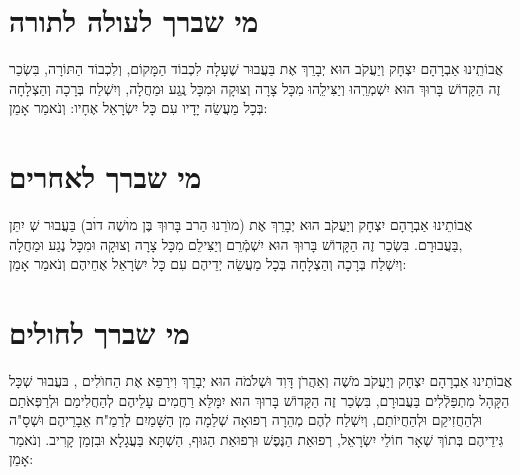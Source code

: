 \documentclass[a4paper, twoside, openany, parskip=half, 12pt]{article}
\begin{document}
\section*{מי שברך לעולה לתורה}
 אֲבוֹתֵֽינוּ אַבְרָהָם יִצְחָק וְיַעֲקֹב הוּא יְבָרֵךְ אֶת 
  בַּעֲבוּר שֶׁעָלָה לִכְבוֹד הַמָּקוֹם,  וְלִכְבוֹד הַתּוֹרָה, 
 בִּשְׂכַר זֶה הַקָּדוֹשׁ בָּרוּךְ הוּא יִשְׁמְרֵֽהוּ וְיַצִּילֵֽהוּ מִכָּל צָרָה וְצוּקָה
וּמִכָּל נֶֽגַע וּמַחֲלָה,
  וְיִשְׁלַח בְּרָכָה וְהַצְלָחָה בְּכָל מַעֲשֵׂה יָדָיו 
    עִם כָּל יִשְׂרָאֵל אֶחָיו: וְנֹאמַר אָמֵן:\\

\section*{מי שברך לאחרים}
 אֲבוֹתֵינוּ אַבְרָהָם יִצְחָק וְיַעֲקֹב הוּא יְבָרֵךְ אֶת (מוׂרֵנוּ הַרב בָּרוּךְ בֶּן מוׄשֶׁה דוׄב) בַּעֲבוּר  שְׁ
  יִתֵּן 
   בַּעֲבוּרָם. בִּשְׂכַר זֶה הַקָּדוֹשׁ בָּרוּךְ הוּא יִשְׁמְֿרֵם וְיַצִּילֵם מִכָּל צָרָה וְצוּקָה וּמִכָּל נֶגַע וּמַחֲלָה,\\
  וְיִשְׁלַח בְּרָכָה וְהַצְלָחָה בְּכָל מַעֲשֵׂה יְדֵיהֶם עִם כָּל יִשְׂרָאֵל אֶחֵיהֶם וְנֹאמַר אָמֵן:\\

\section*{מי שברך לחולים}
 אֲבוֹתֵינוּ אַבְרָהָם יִצְחָק וְיַעֲקֹב מֹשֶׁה וְאַהֲרֹן דָּוִד וּשְׁלֹמֹה הוּא יְבָרֵךְ וִירַפֵּא אֶת הַחוׂלִים 
,
בּעֲבוּר שְׁכָּל הַקָּהָל מִתְפַּלְֿלִים בַּעֲבוּרָם,  בִּשְׂכַר זֶה
 הַקָּדוֹשׁ בָּרוּךְ הוּא יִמָּלֵּא רַחֲמִים עָלֵיהֶם לְהַחֲלִימַם וּלְרַפְּאֹתַם וּלְהַחֲזִיקַם וּלְהַחֲיוֹתַם, וְיִשְׁלַח לְהֶם מְהֵרָה רְפוּאָה שְׁלֵמָה מִן הַשָּׁמַיִם לְרַמַ"ח אֵבָרֵיהֶם וּשְׁסָ"ה גִּידֵיהֶם בְּתוֹךְ שְׁאָר חוֹלֵי יִשְׂרָאֵל, רְפוּאַת הַנֶּפֶשׁ וּרְפוּאַת הַגּוּף,
  הַשְׁתָּא בַּעֲגָלָא וּבִזְמַן קָרִיב. וְנֹאמַר אָמֵן:\\
\end{document}
